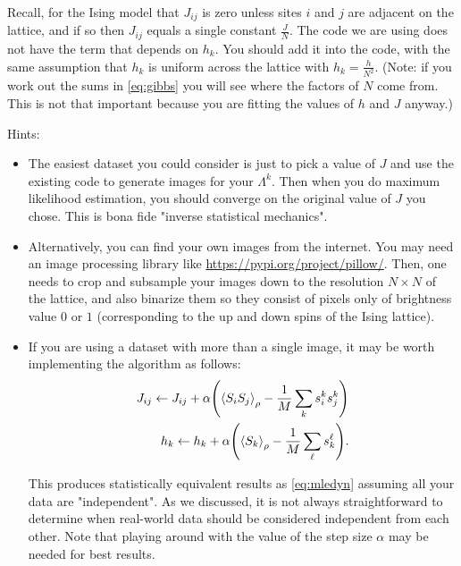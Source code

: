 \documentclass[11pt]{article}
\begin{document}
Recall, for the Ising model that \(J_{ij}\) is zero unless
sites \(i\) and \(j\) are adjacent on the lattice, and if so then \(J_{ij}\)
equals a single constant \(\frac{J}{N}\). The code we are using does not have the term
that depends on \(h_{k}\). You should add it into the code, with the same
assumption that \(h_{k}\) is uniform across the lattice with
\(h_{k} = \frac{h}{N^{2}}\). (Note: if you work out the sums in
\eqref{eq:gibbs} you will see where the factors of \(N\) come from. This is not
that important because you are fitting the values of \(h\) and \(J\) anyway.)

Hints:
\begin{itemize}
\item The easiest dataset you could consider is just to pick a value of \(J\) and use the existing code to generate images for your \(\Lambda^{k}\). Then when you do maximum likelihood estimation, you should converge on the original value of \(J\) you chose. This is bona fide "inverse statistical mechanics".
\item Alternatively, you can find your own images from the internet. You may need an image processing library like \url{https://pypi.org/project/pillow/}. Then, one needs to crop and subsample your images down to the resolution \(N \times N\) of the lattice, and also binarize them so they consist of pixels only of brightness value \(0\) or \(1\) (corresponding to the up and down spins of the Ising lattice).
\item If you are using a dataset with more than a single image, it may be worth implementing the algorithm as follows:
\begin{align*}
J_{ij} \leftarrow J_{ij} + \alpha \qty(\ev{S_{i}S_{j}}_{\rho} - \frac{1}{M} \sum_{k} s^{k}_{i}s^{k}_{j}) \\
h_{k} \leftarrow h_{k} + \alpha \qty(\ev{S_{k}}_{\rho} - \frac{1}{M} \sum_{\ell} s^{\ell}_{k}).
\end{align*}

This produces statistically equivalent results as \eqref{eq:mledyn} assuming all your data are "independent". As we discussed, it is not always straightforward to determine when real-world data should be considered independent from each other. Note that playing around with the value of the step size \(\alpha\) may be needed for best results.
\end{itemize}
\end{document}
